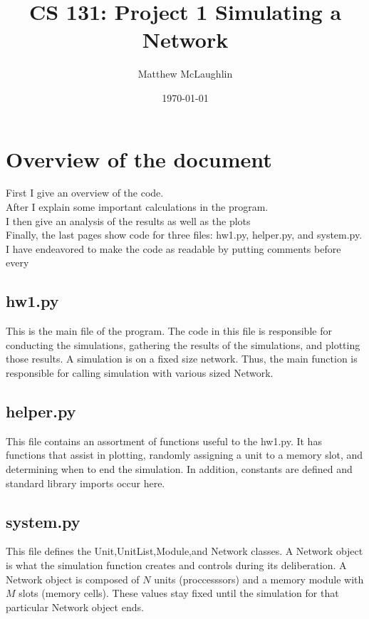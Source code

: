 \documentclass[12pt]{article}
\title{CS 131: Project 1 Simulating a Network}
\author{Matthew McLaughlin}
\date{\today}
\begin{document}
\maketitle


\newpage

\section*{Overview of the document}
First I give an overview of the code. \\
After I explain some important calculations in the program. \\
I then give an analysis of the results as well as the plots \\ 
Finally, the last pages show code for three files: hw1.py, helper.py, and system.py. \\
I have endeavored to make the code as readable by putting comments before every

\subsection*{hw1.py}
This is the main file of the program. The code in this file is responsible for 
conducting the simulations, gathering the results of the simulations,
and plotting those results. A simulation is on a fixed size network.
Thus, the main function is responsible for calling simulation with 
various sized Network. 

\subsection*{helper.py}
This file contains an assortment of functions useful to the hw1.py. 
It has functions that assist in plotting, randomly assigning a unit to 
a memory slot, and determining when to end the simulation. In addition,
constants are defined and standard library imports occur here.

\subsection*{system.py}
This file defines the Unit,UnitList,Module,and Network classes.
A Network object is what the simulation function creates and controls during
its deliberation. A Network object is composed of $N$ units (proccesssors)
and a memory module with $M$ slots (memory cells). These values stay 
fixed until the simulation for that particular Network object ends. 
\end{document}
